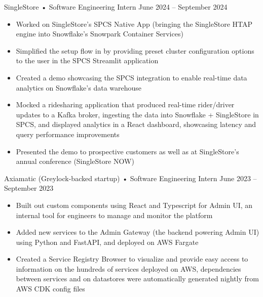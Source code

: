 \documentclass[9pt]{developercv} %
\begin{document}
\begin{entrylist}
	\entry
        {}
		{SingleStore • Software Engineering Intern}
		{June 2024 – September 2024}
		{\vspace{-8pt}
        \begin{itemize}[noitemsep,topsep=0pt,parsep=0pt,partopsep=0pt, leftmargin=10pt]
            \item Worked on SingleStore's SPCS Native App (bringing the SingleStore HTAP engine into Snowflake's Snowpark Container Services)
            \item Simplified the setup flow in by providing preset cluster configuration options to the user in the SPCS Streamlit application
            \item Created a demo showcasing the SPCS integration to enable real-time data analytics on Snowflake's data warehouse
            \item Mocked a ridesharing application that produced real-time rider/driver updates to a Kafka broker, ingesting the data into Snowflake + SingleStore in SPCS, and displayed analytics in a React dashboard, showcasing latency and query performance improvements
            \item Presented the demo to prospective customers as well as at SingleStore's annual conference (SingleStore NOW)
        \end{itemize}}
    \entry
        {}
		{Axiamatic (Greylock-backed startup) • Software Engineering Intern}
		{June 2023 – September 2023}
		{\vspace{-8pt}
        \begin{itemize}[noitemsep,topsep=0pt,parsep=0pt,partopsep=0pt, leftmargin=10pt]
            \item Built out custom components using React and Typescript for Admin UI, an internal tool for engineers to manage and monitor the platform
            \item Added new services to the Admin Gateway (the backend powering Admin UI) using Python and FastAPI, and deployed on AWS Fargate
            \item Created a Service Registry Browser to visualize and provide easy access to information on the hundreds of services deployed on AWS, dependencies between services and on datastores were automatically generated nightly from AWS CDK config files

\end{itemize}}
\end{entrylist}
\end{document}
